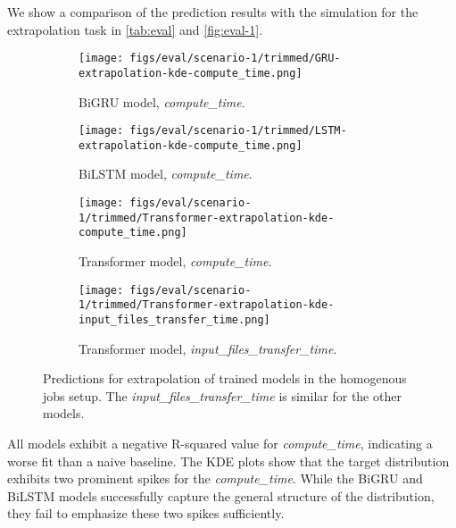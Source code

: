 We show a comparison of the prediction results with the simulation for the extrapolation task in \autoref{tab:eval} and \autoref{fig:eval-1}. 
%
\begin{figure}%
    \begin{subfigure}{.49\linewidth}%
    \centering%
    \texttt{[image: figs/eval/scenario-1/trimmed/GRU-extrapolation-kde-compute\_time.png]}%
    \vspace{-0.5em}%
    \caption{BiGRU model, \textit{compute\_time}.}%
    \label{fig:eval-1-gru-extrapolation-compute}%
    \end{subfigure}%
    \hfill%
    \begin{subfigure}{0.49\linewidth}%
    \centering%
    \texttt{[image: figs/eval/scenario-1/trimmed/LSTM-extrapolation-kde-compute\_time.png]}%
    \caption{BiLSTM model, \textit{compute\_time}.}%
    \label{fig:eval-1-lstm-extrapolation-compute}%
    \end{subfigure}%
    \hfill%
    \vspace{-0.5em}
    \begin{subfigure}{.49\linewidth}%
    \centering%
    \texttt{[image: figs/eval/scenario-1/trimmed/Transformer-extrapolation-kde-compute\_time.png]}%
    \vspace{-0.5em}%
    \caption{Transformer model, \textit{compute\_time}.}%
    \label{fig:eval-1-transformer-extrapolation-compute}%
    \end{subfigure}%
    \hfill%
    \begin{subfigure}{.49\linewidth}%
    \centering%
    \texttt{[image: figs/eval/scenario-1/trimmed/Transformer-extrapolation-kde-input\_files\_transfer\_time.png]}%
    \vspace{-0.5em}%
    \caption{Transformer model, \textit{input\_files\_transfer\_time}.}%
    \label{fig:eval-1-transformer-extrapolation-input_files_transfer_time}%
    \end{subfigure}%
    \caption{Predictions for extrapolation of trained models in the homogenous jobs setup. The \textit{input\_files\_transfer\_time} is similar for the other models.}%
    \label{fig:eval-1}%
\end{figure}%
%
%
All models exhibit a negative R-squared value for \textit{compute\_time}, indicating a worse fit than a naive baseline. 
%
The KDE plots show that the target distribution exhibits two prominent spikes for the \textit{compute\_time}. While the BiGRU and BiLSTM models successfully capture the general structure of the distribution, they fail to emphasize these two spikes sufficiently. 
